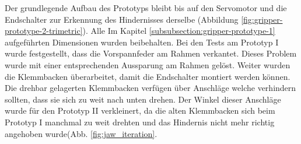 Der grundlegende Aufbau des Prototyps bleibt bis auf den Servomotor und die Endschalter zur Erkennung des Hindernisses derselbe (Abbildung \ref{fig:gripper-prototype-2-trimetric}). Alle Im Kapitel \ref{subsubsection:gripper-prototype-1} aufgeführten Dimensionen wurden beibehalten. Bei den Tests am Prototyp I wurde festgestellt, dass die Vorspannfeder am Rahmen verkantet. Dieses Problem wurde mit einer entsprechenden Aussparung am Rahmen gelöst. Weiter wurden die Klemmbacken überarbeitet, damit die Endschalter montiert werden können. Die drehbar gelagerten Klemmbacken verfügen über Anschläge welche verhindern sollten, dass sie sich zu weit nach unten drehen. Der Winkel dieser Anschläge wurde für den Prototyp II verkleinert, da die alten Klemmbacken sich beim Prototyp I manchmal zu weit drehten und das Hindernis nicht mehr richtig angehoben wurde(Abb. \ref{fig:jaw_iteration}.

